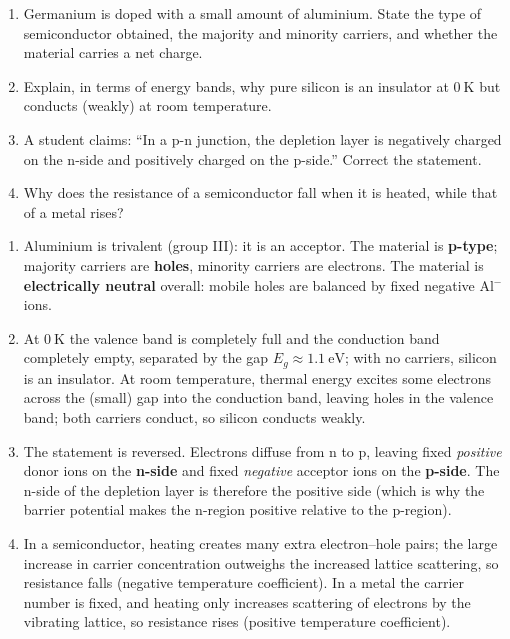 \documentclass[11pt]{article}
\begin{document}
\begin{exercice}
\begin{enumerate}
\item Germanium is doped with a small amount of aluminium. State the type of semiconductor obtained, the majority and minority carriers, and whether the material carries a net charge.
\item Explain, in terms of energy bands, why pure silicon is an insulator at $0\ \mathrm{K}$ but conducts (weakly) at room temperature.
\item A student claims: ``In a p-n junction, the depletion layer is negatively charged on the n-side and positively charged on the p-side.'' Correct the statement.
\item Why does the resistance of a semiconductor fall when it is heated, while that of a metal rises?
\end{enumerate}
\end{exercice}

\begin{corrige}[Exercise 1]
\begin{enumerate}
\item Aluminium is trivalent (group III): it is an acceptor. The material is \textbf{p-type}; majority carriers are \textbf{holes}, minority carriers are electrons. The material is \textbf{electrically neutral} overall: mobile holes are balanced by fixed negative Al$^-$ ions.
\item At $0\ \mathrm{K}$ the valence band is completely full and the conduction band completely empty, separated by the gap $E_g \approx 1.1\ \mathrm{eV}$; with no carriers, silicon is an insulator. At room temperature, thermal energy excites some electrons across the (small) gap into the conduction band, leaving holes in the valence band; both carriers conduct, so silicon conducts weakly.
\item The statement is reversed. Electrons diffuse from n to p, leaving fixed \emph{positive} donor ions on the \textbf{n-side} and fixed \emph{negative} acceptor ions on the \textbf{p-side}. The n-side of the depletion layer is therefore the positive side (which is why the barrier potential makes the n-region positive relative to the p-region).
\item In a semiconductor, heating creates many extra electron--hole pairs; the large increase in carrier concentration outweighs the increased lattice scattering, so resistance falls (negative temperature coefficient). In a metal the carrier number is fixed, and heating only increases scattering of electrons by the vibrating lattice, so resistance rises (positive temperature coefficient).
\end{enumerate}
\end{corrige}
\end{document}
